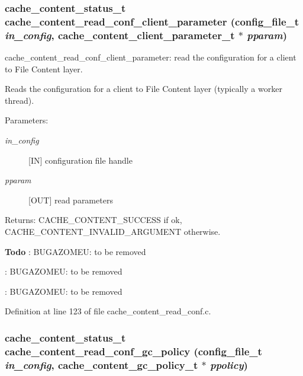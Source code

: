 \subsubsection{\setlength{\rightskip}{0pt plus 5cm}cache\_\-content\_\-status\_\-t cache\_\-content\_\-read\_\-conf\_\-client\_\-parameter (config\_\-file\_\-t {\em in\_\-config}, cache\_\-content\_\-client\_\-parameter\_\-t $\ast$ {\em pparam})}\label{cache__content__read__conf_8c_a0}


cache\_\-content\_\-read\_\-conf\_\-client\_\-parameter: read the configuration for a client to File Content layer.

Reads the configuration for a client to File Content layer (typically a worker thread).

\begin{Desc}
\item[Parameters:]
\begin{description}
\item[{\em in\_\-config}][IN] configuration file handle \item[{\em pparam}][OUT] read parameters\end{description}
\end{Desc}
\begin{Desc}
\item[Returns:]CACHE\_\-CONTENT\_\-SUCCESS if ok, CACHE\_\-CONTENT\_\-INVALID\_\-ARGUMENT otherwise.\end{Desc}


\begin{Desc}
\item[{\bf Todo}]: BUGAZOMEU: to be removed 

: BUGAZOMEU: to be removed 

: BUGAZOMEU: to be removed\end{Desc}


Definition at line 123 of file cache\_\-content\_\-read\_\-conf.c.
\subsubsection{\setlength{\rightskip}{0pt plus 5cm}cache\_\-content\_\-status\_\-t cache\_\-content\_\-read\_\-conf\_\-gc\_\-policy (config\_\-file\_\-t {\em in\_\-config}, cache\_\-content\_\-gc\_\-policy\_\-t $\ast$ {\em ppolicy})}\label{cache__content__read__conf_8c_a2}


